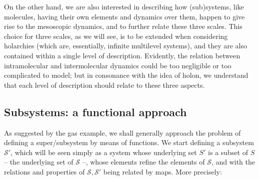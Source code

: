 On the other hand, we are also interested in describing how (sub)systems, like molecules, having their own elements and dynamics over them, happen to give rise to the mesoscopic dynamics, and to further relate these three scales. This choice for three scales, as we will see, is to be extended when considering holarchies (which are, essentially, infinite multilevel systems), and they are also contained within a single level of description. Evidently, the relation between intramolecular and intermolecular dynamics could be too negligible or too complicated to model; but in consonance with the idea of holon, we understand that each level of description should relate to these three aspects.

\subsection{Subsystems: a functional approach}

As suggested by the gas example, we shall generally approach the problem of defining a super/subsystem by means of functions. We start defining a subsystem $\mathcal{S}'$, which will be seen simply as a system whose underlying set $S'$ is a subset of $S$ -- the underlying set of $\mathcal{S}$ --, whose elements refine the elements of $\mathcal{S}$, and with the relations and properties of $\mathcal{S}, \mathcal{S}'$ being related by maps. More precisely:

